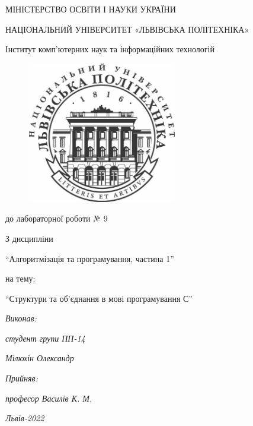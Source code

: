 \begin{titlepage}
\pagestyle{empty}
\begin{center}

	{\fontsize{14}{24}\selectfont МІНІСТЕРСТВО ОСВІТИ І НАУКИ УКРАЇНИ

	НАЦІОНАЛЬНИЙ УНІВЕРСИТЕТ «ЛЬВІВСЬКА ПОЛІТЕХНІКА»

	Інститут комп'ютерних наук та інформаційних технологій

	}

	\vspace{90.4pt} %
	\begin{figure}[h]
		\centering
		\includegraphics[width=6.5cm,keepaspectratio]{../../../lpnu.png}
	\end{figure}

	{\fontsize{18}{29}\selectfont{Звіт}

	{до лабораторної роботи № 9}

	{З дисципліни}

	{``Алгоритмізація та програмування, частина 1''}

	{на тему:}

	{``Структури та об’єднання в мові програмування С''}

	}
\end{center}

\vspace{12.1pt} %
	{\fontsize{14}{22.4}\selectfont
\begin{flushright}
	\textit{Виконав:}

	\textit{студент групи ПП-14}

	\textit{Мілюхін Олександр}

	\textit{Прийняв:}

	\textit{професор Василів К. М.}
\end{flushright}
\vspace{37.4pt} %
\begin{center}
\textit{Львів-2022}
\end{center}
	}
\end{titlepage}
